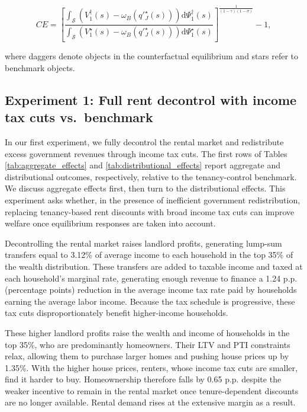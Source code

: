 \documentclass[parskip=full]{article}
\begin{document}
\begin{equation}
  CE = \left[\frac{\int_{\mathcal{S}}\left(V^{\dagger}_{1}(s)-\omega_{B}\left(q'^{\star}_{J}(s)\right)\right)\mathrm{d}\Psi^{\dagger}_{1}(s)}{\int_{\mathcal{S}}\left(V^{\star}_{1}(s)-\omega_{B}\left(q'^{\star}_{J}(s)\right)\right)\mathrm{d}\Psi^{\star}_{1}(s)}\right]^{\frac{1}{(1-\gamma)(1-\sigma)}}-1,
\end{equation}

\noindent where daggers denote objects in the counterfactual equilibrium and stars refer to benchmark objects. 

\subsection{Experiment 1: Full rent decontrol with income tax cuts vs.\ benchmark}\label{sec:exp_1}

In our first experiment, we fully decontrol the rental market and redistribute excess government revenues through income tax cuts. The first rows of Tables \ref{tab:aggregate_effects} and \ref{tab:distributional_effects} report aggregate and distributional outcomes, respectively, relative to the tenancy-control benchmark. We discuss aggregate effects first, then turn to the distributional effects. This experiment asks whether, in the presence of inefficient government redistribution, replacing tenancy-based rent discounts with broad income tax cuts can improve welfare once equilibrium responses are taken into account.

Decontrolling the rental market raises landlord profits, generating lump-sum transfers equal to 3.12\% of average income to each household in the top 35\% of the wealth distribution. These transfers are added to taxable income and taxed at each household's marginal rate, generating enough revenue to finance a 1.24 p.p. (percentage points) reduction in the average income tax rate paid by households earning the average labor income. Because the tax schedule is progressive, these tax cuts disproportionately benefit higher-income households.

These higher landlord profits raise the wealth and income of households in the top 35\%, who are predominantly homeowners. Their LTV and PTI constraints relax, allowing them to purchase larger homes and pushing house prices up by 1.35\%. With the higher house prices, renters, whose income tax cuts are smaller, find it harder to buy. Homeownership therefore falls by 0.65 p.p. despite the weaker incentive to remain in the rental market once tenure-dependent discounts are no longer available. Rental demand rises at the extensive margin as a result.
\end{document}
